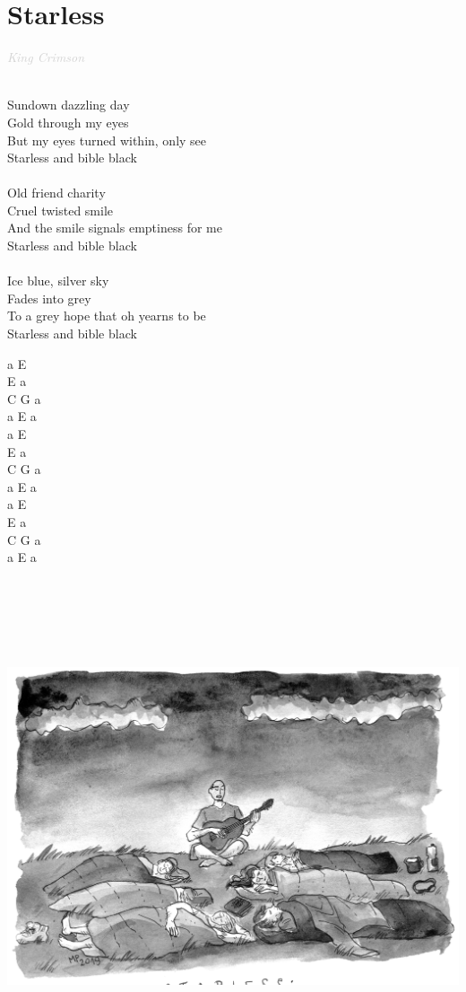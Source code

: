 \documentclass[a5paper, 10pt]{book}
\begin{document}
\newpage
\section{Starless}\textcolor{lightgray}{\textit{King Crimson}}\\~\\
\begin{minipage}[t]{0.65\textwidth}
Sundown dazzling day\\
Gold through my eyes\\
But my eyes turned within, only see\\
Starless and bible black\\
\\
Old friend charity\\
Cruel twisted smile\\
And the smile signals emptiness for me\\
Starless and bible black\\
\\
Ice blue, silver sky\\
Fades into grey\\
To a grey hope that oh yearns to be\\
Starless and bible black\\
\end{minipage}
\begin{minipage}[t]{0.35\textwidth}
a E \\
E a \\
C G a\\
a E a\\

a E \\
E a \\
C G a\\
a E a\\

a E \\
E a \\
C G a\\
a E a\\
\end{minipage}
~\\~\\~\\~\\~\\
\includegraphics[width = \textwidth, center]{starless.png}\\
\end{document}
